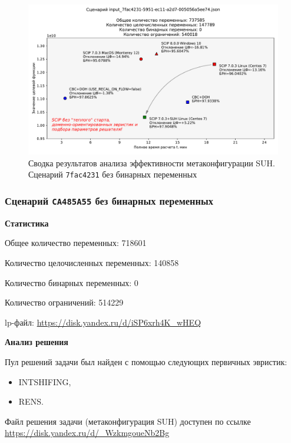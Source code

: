 \documentclass[%
	11pt,
	a4paper,
	utf8,
		]{article}
\begin{document}
\begin{figure}[!h]
	\centering
	\includegraphics[scale=0.6]{figures/summary_7fac4231.pdf}
	\caption{Сводка результатов анализа эффективности метаконфигурации SUH. \\Сценарий \texttt{7fac4231} без бинарных переменных}\label{fig:summary_7fac4231}
\end{figure}

\subsubsection{Сценарий \texttt{CA485A55} без бинарных переменных}

\textbf{Статистика}\vspace*{1mm}

Общее количество переменных: 718601

Количество целочисленных переменных: 140858

Количество бинарных переменных: 0

Количество ограничений: 514229

lp-файл: \url{https://disk.yandex.ru/d/iSP6xrh4K_wHEQ}

\vspace*{5mm}\textbf{Анализ решения}\vspace*{1mm}

Пул решений задачи был найден с помощью следующих первичных эвристик:
\begin{itemize}
	\item INTSHIFING,
	
	\item RENS.
\end{itemize}

Файл решения задачи (метаконфигурация SUH) доступен по ссылке \url{https://disk.yandex.ru/d/_WzkmgoueNb2Bg}
\end{document}
